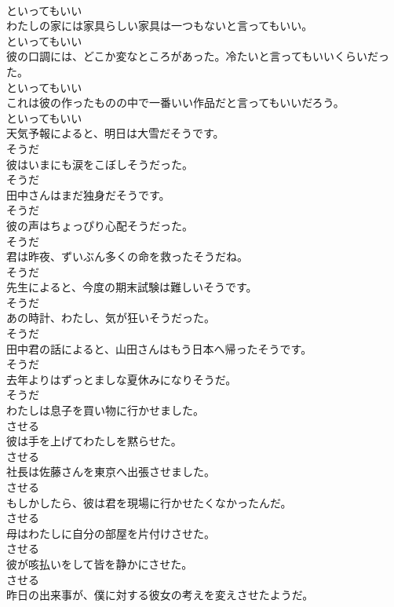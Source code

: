 \documentclass[8pt]{extreport}
\begin{document}
\begin{CJK}{UTF8}{min}
\\	といってもいい
\\	わたしの家には家具らしい家具は一つもないと言ってもいい。	
\\	といってもいい
\\	彼の口調には、どこか変なところがあった。冷たいと言ってもいいくらいだった。	
\\	といってもいい
\\	これは彼の作ったものの中で一番いい作品だと言ってもいいだろう。	
\\	といってもいい
\\	天気予報によると、明日は大雪だそうです。	
\\	そうだ
\\	彼はいまにも涙をこぼしそうだった。	
\\	そうだ
\\	田中さんはまだ独身だそうです。	
\\	そうだ
\\	彼の声はちょっぴり心配そうだった。	
\\	そうだ
\\	君は昨夜、ずいぶん多くの命を救ったそうだね。	
\\	そうだ
\\	先生によると、今度の期末試験は難しいそうです。	
\\	そうだ
\\	あの時計、わたし、気が狂いそうだった。	
\\	そうだ
\\	田中君の話によると、山田さんはもう日本へ帰ったそうです。	
\\	そうだ
\\	去年よりはずっとましな夏休みになりそうだ。	
\\	そうだ
\\	わたしは息子を買い物に行かせました。	
\\	させる
\\	彼は手を上げてわたしを黙らせた。	
\\	させる
\\	社長は佐藤さんを東京へ出張させました。	
\\	させる
\\	もしかしたら、彼は君を現場に行かせたくなかったんだ。	
\\	させる
\\	母はわたしに自分の部屋を片付けさせた。	
\\	させる
\\	彼が咳払いをして皆を静かにさせた。	
\\	させる
\\	昨日の出来事が、僕に対する彼女の考えを変えさせたようだ。	

\end{CJK}
\end{document}
